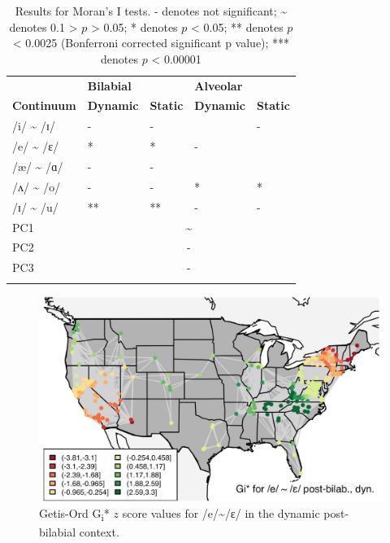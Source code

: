 \documentclass[output=paper]{LSP/langsci}
\begin{document}
\begin{table}[t]
\begin{tabular}{lllll}
\lsptoprule
& {\bfseries Bilabial} &  & {\bfseries Alveolar} & \\
\cmidrule(lr){2-3}\cmidrule(lr){4-5}
{\bfseries Continuum} & {\bfseries Dynamic} & {\bfseries Static} & {\bfseries Dynamic} & {\bfseries Static}\\
\midrule
{\mdseries /i/ {\textasciitilde} /ɪ/} & {\mdseries {}-} & {\mdseries {}-} & {\mdseries {\textasciitilde}} & {\mdseries {}-}\\
{\mdseries /e/ {\textasciitilde} /ɛ/ } & {\mdseries ** } & {\mdseries **} & {\mdseries {}-} & {\mdseries *}\\
{\mdseries /æ/ {\textasciitilde} /ɑ/ } & {\mdseries {}-} & {\mdseries {}-} & {\mdseries {\textasciitilde}} & {\mdseries *}\\
{\mdseries  /ʌ/ {\textasciitilde} /o/} & {\mdseries {}-} & {\mdseries {}-} & {\mdseries **} & {\mdseries **}\\
{\mdseries /ɪ/ {\textasciitilde} /u/} & {\mdseries ***} & {\mdseries ***} & {\mdseries {}-} & {\mdseries {}-}\\
\midrule
{\mdseries PC1} & \multicolumn{4}{c}{ {\textasciitilde}\par}\\
{\mdseries PC2} & \multicolumn{4}{c}{ {}-\par}\\
{\mdseries PC3} & \multicolumn{4}{c}{ {}-\par}\\
\lspbottomrule
\end{tabular}
\caption{Results for Moran’s I tests. {}- denotes not significant; {\textasciitilde} denotes 0.1 {\textgreater} $p$ {\textgreater} 0.05; * denotes $p$ {\textless} 0.05; ** denotes $p$ {\textless} 0.0025 (Bonferroni corrected significant p value); *** denotes $p$ {\textless} 0.00001}
\label{tab:2}
\end{table}

 
\begin{figure}
\includegraphics[width=\textwidth]{illustrations/kend_frid_fig3}
\caption{Getis-Ord G\textsubscript{i}* $z$ score values for /e/{\textasciitilde}/ɛ/ in the dynamic post-bilabial context.}
\label{fig:3}
\end{figure}
\end{document}
